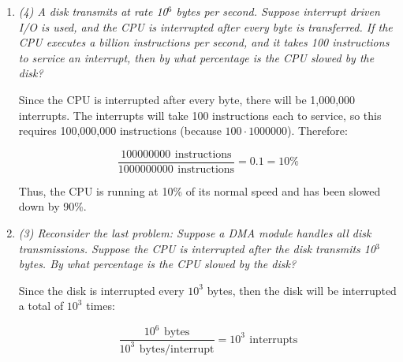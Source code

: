 \documentclass[letterpaper,11pt]{article}
\newcommand{\superscript}[1]{\ensuremath{^{\textrm{#1}}}}
\newcommand{\unit}[1]{\ensuremath{\, \mathrm{#1}}}
\begin{document}
\begin{enumerate}
%
%
%
%
%

  \item \emph{(4) A disk transmits at rate 10\superscript{6} bytes per second. Suppose interrupt driven I/O is used, and the CPU is interrupted after every byte is transferred. If the CPU executes a billion instructions per second, and it takes 100 instructions to service an interrupt, then by what percentage is the CPU slowed by the disk?}

  Since the CPU is interrupted after every byte, there will be 1,000,000 interrupts.  The interrupts will take 100 instructions each to service, so this requires 100,000,000 instructions (because $100 \cdot 1000000$).  Therefore:

  \begin{equation} \frac{100000000\ \unit{instructions}}{1000000000\ \unit{instructions}} = 0.1 = 10\%\end{equation}
  
  Thus, the CPU is running at 10\% of its normal speed and has been slowed down by 90\%.
  \item \emph{(3) Reconsider the last problem: Suppose a DMA module handles all disk transmissions. Suppose the CPU is interrupted after the disk transmits 10\superscript{3} bytes. By what percentage is the CPU slowed by the disk?}

  Since the disk is interrupted every $10^3$ bytes, then the disk will be interrupted a total of $10^3$ times:

  \begin{equation} \frac{10^6\ \unit{bytes}}{10^3\ \unit{bytes/interrupt}} = 10^3\ \unit{interrupts}\end{equation}


\end{enumerate}
\end{document}
